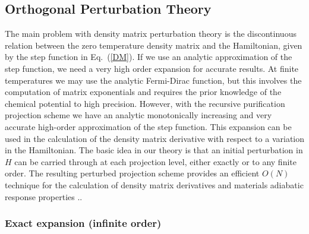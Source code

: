 \documentclass[twocolumn,showpacs,preprintnumbers,amsmath,amssymb]{revtex4}
\begin{document}
\subsection{Orthogonal Perturbation Theory}

The main problem with density matrix perturbation theory is the
discontinuous relation between the zero temperature density matrix
and the Hamiltonian, given by the step function in Eq.\ (\ref{DM}). 
If we use an analytic approximation of the step
function, we need a very high order expansion for accurate results. 
At finite temperatures we may use the analytic Fermi-Dirac function, but this involves
the computation of matrix exponentials and requires the prior knowledge
of the chemical potential to high precision.
However, with the recursive purification projection scheme we have an analytic
monotonically increasing and very accurate high-order approximation of the step function.
This expansion can be used in the calculation of the density matrix derivative with respect
to a variation in the Hamiltonian.  The basic idea in our theory is that 
an initial perturbation in $H$ can be carried through at each projection
level, either exactly or to any finite order. The resulting
perturbed projection scheme provides an efficient $O(N)$ technique for
the calculation of density matrix derivatives and materials adiabatic response properties 
\cite{NiklassonPRT1,WeberPRT2}..

\subsubsection{Exact expansion (infinite order)}
\end{document}

